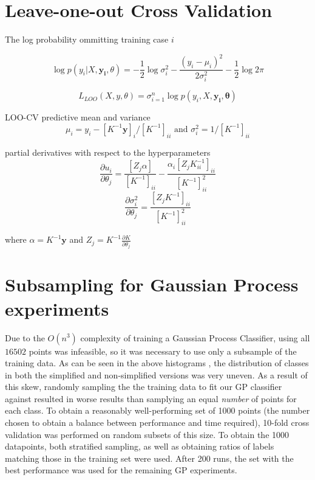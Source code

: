 \section{Leave-one-out Cross Validation}

The log probability ommitting training case $i$

$$\log p(y_i|X, \mathbf{y_i}, \theta) = -\frac{1}{2}\log\sigma^2_i - \frac{(y_i - \mu_i)^2}{2 \sigma^2_i} - \frac{1}{2}\log2\pi$$

$$ L_{LOO}(X, y, \theta) = \sigma^n_{i=1} \log p(y_i, X, \mathbf{y_i}, \mathbf{\theta})$$

LOO-CV predictive mean and variance
$$\mu_i= y_i - [K^{-1}\mathbf{y}]_i / [K^{-1}]_{ii} \text{ and } \sigma_i^2 = 1/[K^{-1}]_{ii}$$

partial derivatives with respect to the hyperparameters
$$\frac{\partial{u_i}}{\partial{\theta_j}} = \frac{[Z_j \alpha]}{[K^{-1}]_{ii}} - \frac{\alpha_i[Z_j K^{-1}_{ii}]_{ii}}{[K^{-1}]^2_{ii}}$$
$$\frac{\partial{\sigma_i^2}}{\partial{\theta_j}} = \frac{[Z_jK^{-1}]_{ii}}{[K^{-1}]^2_{ii}}$$

where $\alpha = K^{-1}\mathbf{y}$ and $Z_j = K^{-1} \frac{\partial{K}}{\partial{\theta_j}}$

\section{Subsampling for Gaussian Process experiments}

Due to the $O(n^3)$ complexity of training a Gaussian Process Classifier, using all $16502$ points was infeasible, so it was necessary to use only a subsample of the training data. As can be seen in the above histograms , the distribution of classes in both the simplified and non-simplified versions was very uneven. As a result of this skew, randomly sampling the the training data to fit our GP classifier against resulted in worse results than samplying an equal \textit{number} of points for each class. To obtain a reasonably well-performing set of 1000 points (the number chosen to obtain a balance between performance and time required), 10-fold cross validation was performed on random subsets of this size. To obtain the 1000 datapoints, both stratified sampling, as well as obtaining ratios of labels matching those in the training set were used. After 200 runs, the set with the best performance was used for the remaining GP experiments.

